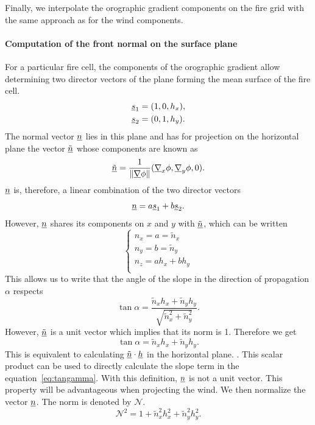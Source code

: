 Finally, we interpolate the orographic gradient components on the fire grid with the same approach as for the wind components. 

\paragraph{Computation of the front normal on the surface plane}
For a particular fire cell, the components of the orographic gradient allow determining two director vectors of the plane forming the mean surface of the fire cell.
\begin{align}
	\underline{s}_1 &= ( 1, 0, h_x ), \\
	\underline{s}_2 &= (0,1,h_y).
\end{align}
The normal vector $\underline{n}$ lies in this plane and has for projection on the horizontal plane the vector $\underline{\tilde n}$ whose components are known as
\begin{equation}
  \underline{\tilde n} = \frac{1}{\| \underline{\nabla} \phi \|} (\underline{\nabla}_x \phi, \underline{\nabla}_y \phi, 0 ).
\end{equation}
$\underline{n}$ is, therefore, a linear combination of the two director vectors
\begin{equation}
  \underline{n} = a \underline{s}_1 + b \underline{s}_2.
\end{equation}
However, $\underline{n}$ shares its components on $x$ and $y$ with $\underline{\tilde n}$, which can be written
\begin{equation}
  \begin{cases}
  	n_x = a = \tilde n_x \\
  	n_y = b = \tilde n_y \\
  	n_z = a h_x + b h_y \\
  \end{cases}
\end{equation}
This allows us to write that the angle of the slope in the direction of propagation $\alpha$ respects
\begin{equation}
  \tan \alpha = \frac{\tilde n_x h_x + \tilde n_y h_y}{\sqrt{\tilde n_x^2 + \tilde n_y^2}}.
\end{equation}
However, $\underline{\tilde n}$ is a unit vector which implies that its norm is 1. Therefore we get 
\begin{equation}
  \tan \alpha = \tilde n_x h_x + \tilde n_y h_y.
  \label{eq:alphadef}
\end{equation}
This is equivalent to calculating $\underline{\tilde n} \cdot \underline{h} $ in the horizontal plane. . This scalar product can be used to directly calculate the slope term in the equation~\eqref{eq:tangamma}. 
With this definition, $\underline{n}$ is not a unit vector. This property will be advantageous when projecting the wind. We then normalize the vector $\underline{n}$. The norm is denoted by $\mathcal N$.
\begin{equation}
  \mathcal N^2 = 1 + \tilde n_x^2 h_x^2 + \tilde n_y^2 h_y^2.
\end{equation}

